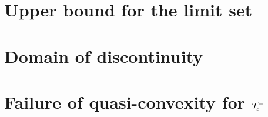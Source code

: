 \documentclass[12pt, reqno]{amsart}
\begin{document}
\section{Upper bound for the limit set}
\label{sec:upper-bound-limit-set}

\section{Domain of discontinuity}
\label{sec:domain-discontinuity}

\section{Failure of quasi-convexity for $\mathcal{T}_{\varepsilon}^{-}$}
\label{sec:fail-quasi-conv}



\printbibliography
\end{document}
